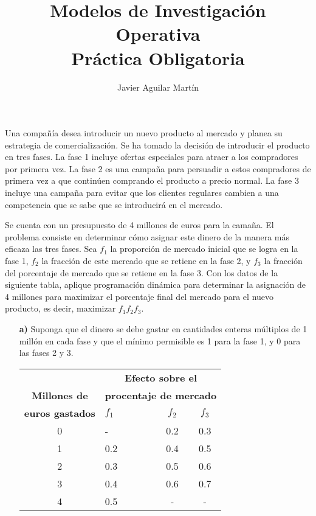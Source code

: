 \documentclass[twoside]{article}
\begin{document}
\title{Modelos de Investigación Operativa\\ Práctica Obligatoria}
\author{Javier Aguilar Martín}
\maketitle



\begin{ejercicio}{1}
Una compañía desea introducir un nuevo producto al mercado y planea su estrategia de comercialización. Se ha tomado la decisión de introducir el producto en tres fases. La fase 1 incluye ofertas especiales para atraer a los compradores por primera vez. La fase 2 es una campaña para persuadir a estos compradores de primera vez a que continúen comprando el producto a precio normal. La fase 3 incluye una campaña para evitar que los clientes regulares cambien a una competencia que se sabe que se introducirá en el mercado.

Se cuenta con un presupuesto de 4 millones de euros para la camaña. El problema consiste en determinar cómo asignar este dinero de la manera más eficaza las tres fases. Sea $f_1$ la proporción de mercado inicial que se logra en la fase 1, $f_2$ la fracción de este mercado que se retiene en la fase 2, y $f_3$ la fracción del porcentaje de mercado que se retiene en la fase 3. Con los datos de la siguiente tabla, aplique programación dinámica para determinar la asignación de 4 millones para maximizar el porcentaje final del mercado para el nuevo producto, es decir, maximizar $f_1f_2f_3$. 
\begin{itemize}
\item[\textbf{a)}] Suponga que el dinero se debe gastar en cantidades enteras múltiplos de 1 millón en cada fase y que el mínimo permisible es 1 para la fase 1, y 0 para las fases 2 y 3.
\begin{center}
\begin{tabular}{c|lcc}
 & \multicolumn{3}{c}{\textbf{Efecto sobre el}}\\
\textbf{Millones de } & \multicolumn{3}{c}{\textbf{procentaje de mercado}} \\\cline{2-4}
\textbf{euros gastados} & $f_1\qquad$ & $f_2$ & $f_3$\\
\hline
0 & - & 0.2 & 0.3\\
1 & 0.2 & 0.4 & 0.5\\
2 & 0.3 & 0.5 & 0.6\\
3 & 0.4 & 0.6 & 0.7\\
4 & 0.5 & - & -
\end{tabular}
\end{center}


\end{itemize}
\end{ejercicio}
\end{document}
